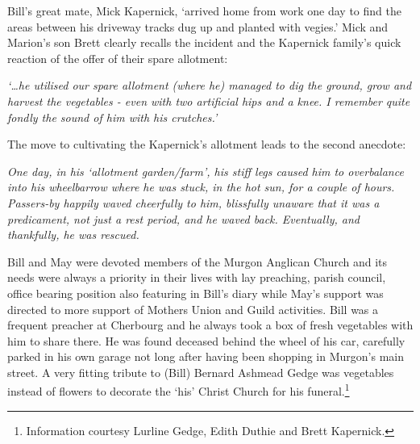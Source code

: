 Bill's great mate, Mick Kapernick, `arrived home from work one day to find the areas between his driveway tracks dug up and planted with vegies.' Mick and Marion's son Brett clearly recalls the incident and the Kapernick family's quick reaction of the offer of their spare allotment:



\emph{`\ldots he utilised our spare allotment (where he) managed to dig the ground, grow and harvest the vegetables - even with two artificial hips and a knee. I remember quite fondly the sound of him with his crutches.'}



The move to cultivating the Kapernick's allotment leads to the second anecdote:



\emph{One day, in his `allotment garden/farm', his stiff legs caused him to overbalance into his wheelbarrow where he was stuck, in the hot sun, for a couple of hours. Passers-by happily waved cheerfully to him, blissfully unaware that it was a predicament, not just a rest period, and he waved back. Eventually, and thankfully, he was rescued.}



Bill and May were devoted members of the Murgon Anglican Church and its needs were always a priority in their lives with lay preaching, parish council, office bearing position also featuring in Bill's diary while May's support was directed to more support of Mothers Union and Guild activities. Bill was a frequent preacher at Cherbourg and he always took a box of fresh vegetables with him to share there. He was found deceased behind the wheel of his car, carefully parked in his own garage not long after having been shopping in Murgon's main street. A very fitting tribute to (Bill) Bernard Ashmead Gedge was vegetables instead of flowers to decorate the `his' Christ Church for his funeral.\footnote{Information courtesy Lurline Gedge, Edith Duthie and Brett Kapernick.}








